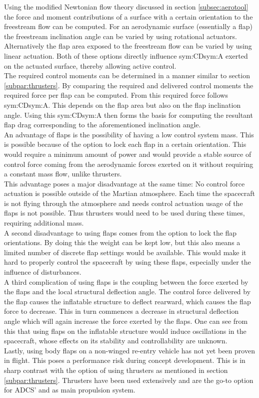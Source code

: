 Using the modified Newtonian flow theory discussed in section \ref{subsec:aerotool} the force and moment contributions of a surface with a certain orientation to the freestream flow can be computed. For an aerodynamic surface (essentially a flap) the freestream inclination angle can be varied by using rotational actuators. Alternatively the flap area exposed to the freestream flow can be varied by using linear actuation. Both of these options directly influence \gls{sym:CD}\gls{sym:A} exerted on the actuated surface, thereby allowing active control.\\
The required control moments can be determined in a manner similar to section \ref{subpar:thrusters}. By comparing the required and delivered control moments the required force per flap can be computed. From this required force follows \gls{sym:CD}\gls{sym:A}. This depends on the flap area but also on the flap inclination angle. Using this \gls{sym:CD}\gls{sym:A} then forms the basis for computing the resultant flap drag corresponding to the aforementioned inclination angle.\\
An advantage of flaps is the possibility of having a low control system mass. This is possible because of the option to lock each flap in a certain orientation. This would require a minimum amount of power and would provide a stable source of control force coming from the aerodynamic forces exerted on it without requiring a constant mass flow, unlike thrusters.\\
This advantage poses a major disadvantage at the same time: No control force actuation is possible outside of the Martian atmosphere. Each time the spacecraft is not flying through the atmosphere and needs control actuation usage of the flaps is not possible. Thus thrusters would need to be used during these times, requiring additional mass.\\
A second disadvantage to using flaps comes from the option to lock the flap orientations. By doing this the weight can be kept low, but this also means a limited number of discrete flap settings would be available. This would make it hard to properly control the spacecraft by using these flaps, especially under the influence of disturbances.\\
A third complication of using flaps is the coupling between the force exerted by the flaps and the local structural deflection angle. The control force delivered by the flap causes the inflatable structure to deflect rearward, which causes the flap force to decrease. This in turn commences a decrease in structural deflection angle which will again increase the force exerted by the flaps. One can see from this that using flaps on the inflatable structure would induce oscillations in the spacecraft, whose effects on its stability and controllability are unknown.\\
Lastly, using body flaps on a non-winged re-entry vehicle has not yet been proven in flight. This poses a performance risk during concept development. This is in sharp contrast with the option of using thrusters as mentioned in section \ref{subpar:thrusters}. Thrusters have been used extensively and are the go-to option for ADCS' and as main propulsion system.
